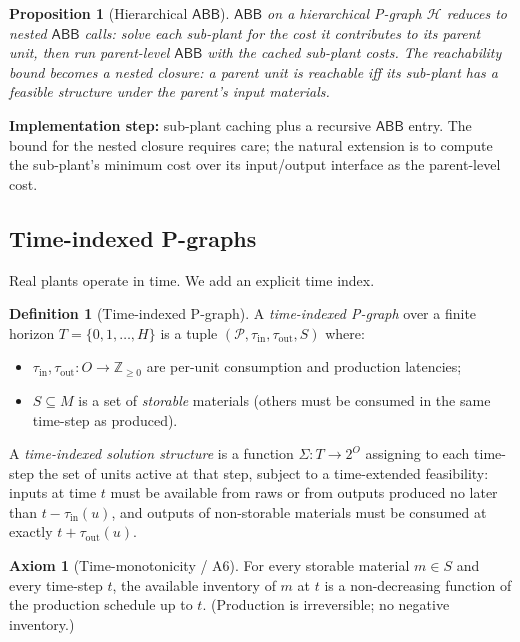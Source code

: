 \documentclass[11pt,a4paper]{article}
\theoremstyle{plain}
\newtheorem{proposition}[theorem]{Proposition}
\theoremstyle{definition}
\newtheorem{definition}[theorem]{Definition}
\newtheorem{axiom}{Axiom}[section]
\newcommand{\abb}{\textsf{ABB}}
\begin{document}
\begin{proposition}[Hierarchical $\abb$]
\label{prop:hier-abb}
$\abb$ on a hierarchical P-graph $\mathcal{H}$ reduces to nested
$\abb$ calls: solve each sub-plant for the cost it contributes to
its parent unit, then run parent-level $\abb$ with the cached
sub-plant costs. The reachability bound becomes a
\emph{nested closure}: a parent unit is reachable iff its
sub-plant has a feasible structure under the parent's input
materials.
\end{proposition}

\textbf{Implementation step:} sub-plant caching plus a recursive
$\abb$ entry. The bound for the nested closure requires care;
the natural extension is to compute the sub-plant's minimum cost
over its input/output interface as the parent-level cost.

\subsection{Time-indexed P-graphs}

Real plants operate in time. We add an explicit time index.

\begin{definition}[Time-indexed P-graph]
\label{def:time}
A \emph{time-indexed P-graph} over a finite horizon
$T = \{0, 1, \ldots, H\}$ is a tuple
$(\mathcal{P}, \tau_{\mathrm{in}}, \tau_{\mathrm{out}}, S)$
where:
\begin{itemize}
\item $\tau_{\mathrm{in}}, \tau_{\mathrm{out}} : O \to \mathbb{Z}_{\geq 0}$
      are per-unit consumption and production latencies;
\item $S \subseteq M$ is a set of \emph{storable} materials
      (others must be consumed in the same time-step as produced).
\end{itemize}
A \emph{time-indexed solution structure} is a function
$\Sigma : T \to 2^O$ assigning to each time-step the set of units
active at that step, subject to a time-extended feasibility:
inputs at time $t$ must be available from raws or from outputs
produced no later than $t - \tau_{\mathrm{in}}(u)$, and outputs
of non-storable materials must be consumed at exactly
$t + \tau_{\mathrm{out}}(u)$.
\end{definition}

\begin{axiom}[Time-monotonicity / A6]
\label{ax:time}
For every storable material $m \in S$ and every time-step $t$,
the available inventory of $m$ at $t$ is a non-decreasing function
of the production schedule up to $t$. (Production is irreversible;
no negative inventory.)
\end{axiom}
\end{document}
